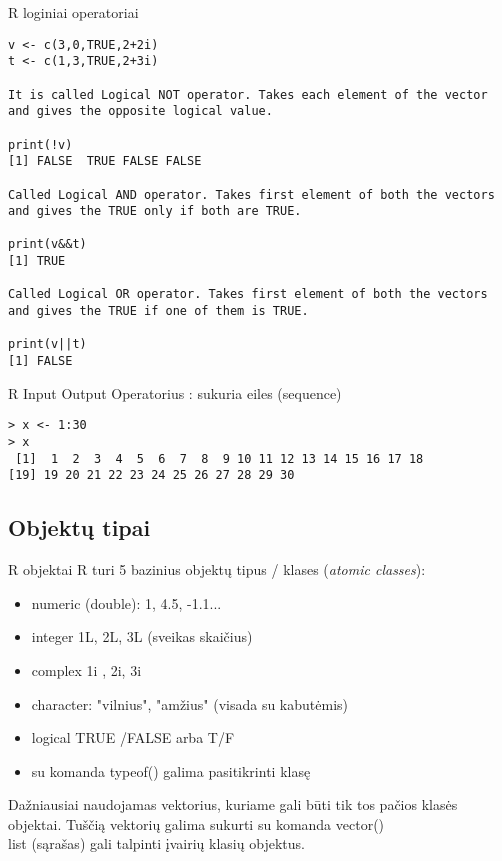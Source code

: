 \documentclass[11pt,xcolor=table]{beamer}
\begin{document}
\begin{frame}[fragile]{R loginiai operatoriai
}
\begin{lstlisting}
v <- c(3,0,TRUE,2+2i)
t <- c(1,3,TRUE,2+3i)

It is called Logical NOT operator. Takes each element of the vector and gives the opposite logical value.

print(!v)
[1] FALSE  TRUE FALSE FALSE

Called Logical AND operator. Takes first element of both the vectors and gives the TRUE only if both are TRUE.

print(v&&t)
[1] TRUE

Called Logical OR operator. Takes first element of both the vectors and gives the TRUE if one of them is TRUE.

print(v||t) 
[1] FALSE
\end{lstlisting}
\end{frame}










\begin{frame}[fragile]{R Input Output}
Operatorius : sukuria eiles (sequence)
\begin{lstlisting}
> x <- 1:30
> x
 [1]  1  2  3  4  5  6  7  8  9 10 11 12 13 14 15 16 17 18
[19] 19 20 21 22 23 24 25 26 27 28 29 30
\end{lstlisting}
\end{frame}





\subsection{Objektų tipai}

\begin{frame}[fragile]{R objektai}
R turi 5 bazinius objektų tipus / klases (\textit{atomic classes}):
\begin{itemize}
\item numeric (double): 1, 4.5, -1.1...
\item integer 1L, 2L, 3L (sveikas skaičius)
\item complex 1i , 2i, 3i
\item character: "vilnius", "amžius" (visada su kabutėmis)
\item logical TRUE /FALSE arba T/F
\item su komanda typeof() galima pasitikrinti klasę
\end{itemize}
Dažniausiai naudojamas vektorius, kuriame gali būti tik tos pačios klasės objektai. Tuščią vektorių galima sukurti su komanda vector()\\
list (sąrašas) gali talpinti įvairių klasių objektus.
\end{frame}
\end{document}
